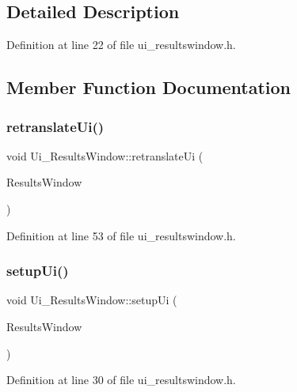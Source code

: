 \subsection{Detailed Description}


Definition at line 22 of file ui\+\_\+resultswindow.\+h.



\subsection{Member Function Documentation}
\mbox{\label{class_ui___results_window_a373444cf96474236c90128a548afffae}} 
\subsubsection{\texorpdfstring{retranslateUi()}{retranslateUi()}}
{\footnotesize\ttfamily void Ui\+\_\+\+Results\+Window\+::retranslate\+Ui (\begin{DoxyParamCaption}\item[{Q\+Widget $\ast$}]{Results\+Window }\end{DoxyParamCaption})\hspace{0.3cm}{\ttfamily [inline]}}



Definition at line 53 of file ui\+\_\+resultswindow.\+h.

\mbox{\label{class_ui___results_window_aed90c2de85fe8a5e2aad1c63b6e8af71}} 
\subsubsection{\texorpdfstring{setupUi()}{setupUi()}}
{\footnotesize\ttfamily void Ui\+\_\+\+Results\+Window\+::setup\+Ui (\begin{DoxyParamCaption}\item[{Q\+Widget $\ast$}]{Results\+Window }\end{DoxyParamCaption})\hspace{0.3cm}{\ttfamily [inline]}}



Definition at line 30 of file ui\+\_\+resultswindow.\+h.



